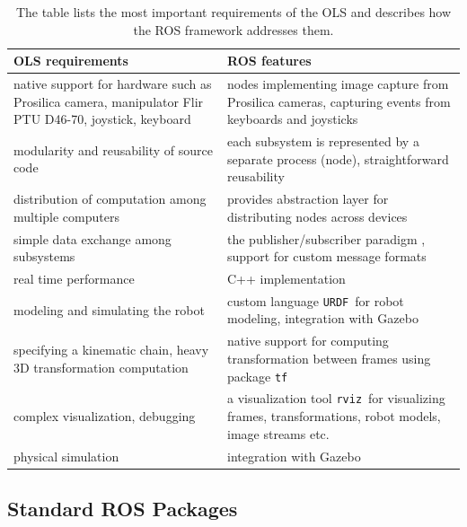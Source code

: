 {\renewcommand{\arraystretch}{1.5}
	\begin{table}[htbp]
		\centering
		\caption{The table lists the most important requirements of the OLS and describes how the ROS framework addresses them.}
		\begin{tabularx}{0.99\textwidth}{XX}
			\toprule
			\textbf{OLS requirements} & \textbf{ROS features} \\
			\midrule
			native support for hardware such as Prosilica camera, manipulator Flir PTU D46-70, joystick, keyboard & nodes implementing image capture from Prosilica cameras, capturing events from keyboards and joysticks \\
			modularity and reusability of source code & each subsystem is represented by a separate process (node), straightforward reusability \\
			distribution of computation among multiple computers & provides abstraction layer for distributing nodes across devices \\
			simple data exchange among subsystems & the publisher/subscriber paradigm \cite{O'Kane201310}, support for custom message formats \\
			real time performance & C++ implementation \\
			modeling and simulating the robot & custom language \texttt{URDF}\footnotemark ~for robot modeling, integration with Gazebo \\
			specifying a kinematic chain, heavy 3D transformation computation & native support for computing transformation between frames using package \texttt{tf} \\
			complex visualization, debugging & a visualization tool \texttt{rviz}\footnotemark ~for visualizing frames, transformations, robot models, image streams etc. \\
			physical simulation & integration with Gazebo \\
			\bottomrule
		\end{tabularx}
		\label{tab:ols_requirements_ros_features}
	\end{table}}
	
	
	\subsection{Standard ROS Packages}
	
